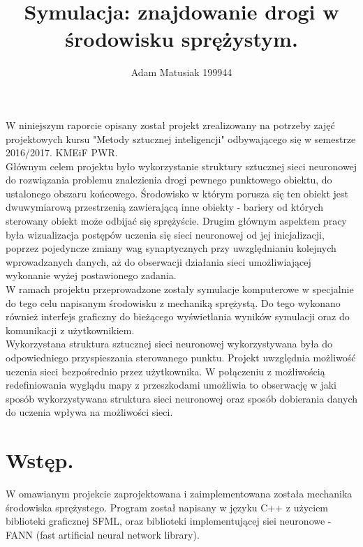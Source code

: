 \documentclass{article}
\author{Adam Matusiak 199944}
\title{Symulacja: znajdowanie drogi w środowisku sprężystym.}
\begin{document}
\maketitle
\indent W niniejszym raporcie opisany został projekt zrealizowany na potrzeby zajęć projektowych kursu "Metody sztucznej inteligencji" odbywającego się w semestrze 2016/2017. KMEiF PWR. \\
\indent Głównym celem projektu było wykorzystanie struktury sztucznej sieci neuronowej do rozwiązania problemu znalezienia drogi pewnego punktowego obiektu, do ustalonego obszaru końcowego. Środowisko w którym porusza się ten obiekt jest dwuwymiarową przestrzenią zawierającą inne obiekty - bariery od których sterowany obiekt może odbijać się sprężyście. Drugim głównym aspektem pracy była wizualizacja postępów uczenia się sieci neuronowej od jej inicjalizacji, poprzez pojedyncze zmiany wag synaptycznych przy uwzględnianiu kolejnych wprowadzanych danych, aż do obserwacji działania sieci umożliwiającej wykonanie wyżej postawionego zadania. \\
\indent W ramach projektu przeprowadzone zostały symulacje komputerowe w specjalnie do tego celu napisanym środowisku z mechaniką sprężystą. Do tego wykonano również interfejs graficzny do bieżącego wyświetlania wyników symulacji oraz do komunikacji z użytkownikiem.  \\
\indent Wykorzystana struktura sztucznej sieci neuronowej wykorzystywana była do odpowiedniego przyspieszania sterowanego punktu. Projekt uwzględnia możliwość uczenia sieci bezpośrednio przez użytkownika. W połączeniu z możliwością redefiniowania wyglądu mapy z przeszkodami umożliwia to obserwację w jaki sposób wykorzystywana struktura sieci neuronowej oraz sposób dobierania danych do uczenia wpływa na możliwości sieci. \\

\section{Wstęp.}
\indent W omawianym projekcie zaprojektowana i zaimplementowana została mechanika środowiska sprężystego. Program został napisany w języku C++ z użyciem biblioteki graficznej SFML, oraz biblioteki implementującej siei neuronowe - FANN (fast artificial neural network library).
\\
\end{document}
